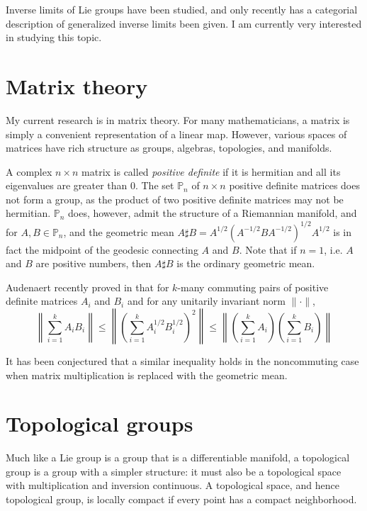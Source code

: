 \documentclass[11pt]{article}
\begin{document}
Inverse limits of Lie groups have been studied, and only recently has a
categorial description of generalized inverse limits been given. I am currently
very interested in studying this topic.

\section{Matrix theory}

My current research is in matrix theory. For many mathematicians, a matrix is
simply a convenient representation of a linear map. However, various spaces of
matrices have rich structure as groups, algebras, topologies, and manifolds.

A complex \( n \times n \)
matrix is called \emph{positive definite} if it is hermitian and all its
eigenvalues are greater than $0$. The set \( \mathbb{P}_n \)
of \( n \times n \)
positive definite matrices does not form a group, as the product of two positive
definite matrices may not be hermitian. \( \mathbb{P}_n \)
does, however, admit the structure of a Riemannian manifold, and for
\( A,B \in \mathbb{P}_n \),
and the geometric mean
\( A \sharp B = A^{1/2}(A^{-1/2}BA^{-1/2})^{1/2}A^{1/2} \)
is in fact the midpoint of the geodesic connecting $A$ and $B$. Note that if \(
n = 1 \), i.e. $A$ and $B$ are positive numbers, then \( A \sharp B \) is the
ordinary geometric mean.

Audenaert recently proved in \cite{au15} that for $k$-many commuting pairs of
positive definite matrices \( A_i \) and \( B_i \) and for any unitarily
invariant norm \( \|\cdot\| \), \[ \left\| \sum_{i=1}^kA_iB_i\right\| \leq
  \left\|\left(\sum_{i=1}^kA_i^{1/2}B_i^{1/2}\right)^2\right\| \leq
  \left\|\left( \sum_{i=1}^kA_i \right)\left( \sum_{i=1}^kB_i\right)\right\| \]

It has been conjectured that a similar inequality holds in the noncommuting case
when matrix multiplication is replaced with the geometric mean.

\section{Topological groups}

Much like a Lie group is a group that is a differentiable manifold, a
topological group is a group with a simpler structure: it must also be a
topological space with multiplication and inversion continuous. A topological
space, and hence topological group, is locally compact if every point has a
compact neighborhood.
\end{document}
